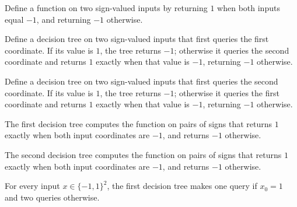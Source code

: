 \begin{definition}
\label{FABL.nandFunction}
\leanok
{}
Define a function on two sign-valued inputs by returning $1$ when both inputs equal
$-1$, and returning $-1$ otherwise.
\end{definition}

\begin{definition}
\label{FABL.nandTree01}
\leanok
{}
Define a decision tree on two sign-valued inputs that first queries the first
coordinate. If its value is $1$, the tree returns $-1$; otherwise it queries the second
coordinate and returns $1$ exactly when that value is $-1$, returning $-1$ otherwise.
\end{definition}

\begin{definition}
\label{FABL.nandTree10}
\leanok
{}
Define a decision tree on two sign-valued inputs that first queries the second
coordinate. If its value is $1$, the tree returns $-1$; otherwise it queries the first
coordinate and returns $1$ exactly when that value is $-1$, returning $-1$ otherwise.
\end{definition}

\begin{theorem}
\label{FABL.nandTree01_computes}
\leanok
{}
The first decision tree computes the function on pairs of signs that returns $1$ exactly
when both input coordinates are $-1$, and returns $-1$ otherwise.
\end{theorem}

\begin{theorem}
\label{FABL.nandTree10_computes}
\leanok
{}
The second decision tree computes the function on pairs of signs that returns $1$
exactly when both input coordinates are $-1$, and returns $-1$ otherwise.
\end{theorem}

\begin{theorem}
\label{FABL.nandTree01_queryCount}
\leanok
{}
For every input $x\in\{−1,1\}^2$, the first decision tree makes one query if $x_0=1$ and
two queries otherwise.
\end{theorem}


